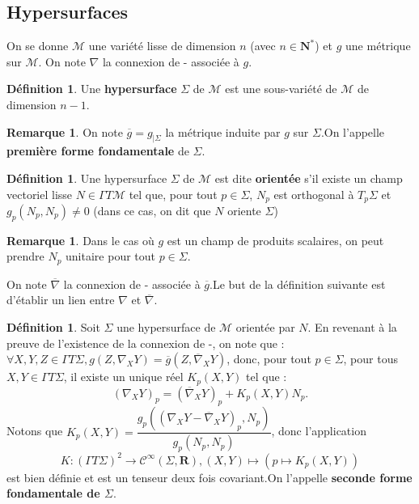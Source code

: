 \documentclass[12pt,a4paper]{article}
\theoremstyle{definition}
\newtheorem{defn}[thm]{Définition}
\newtheorem{rqe}[thm]{Remarque}
\begin{document}
\subsection{Hypersurfaces}
On se donne $\mathcal{M}$ une variété lisse de dimension $n$ (avec $n\in\mathbf{N}^*$) et $g$ une métrique sur $\mathcal{M}$. On note $\nabla$ la connexion de - associée à $g$.
\begin{defn}
Une \textbf{hypersurface} $\Sigma$ de $\mathcal{M}$ est une sous-variété de $\mathcal{M}$ de dimension $n-1$.
\end{defn}
\begin{rqe}
On note $\overline{g}=g_{|\Sigma}$ la métrique induite par $g$ sur $\Sigma$.\newline On l'appelle \textbf{première forme fondamentale} de $\Sigma$.
\end{rqe}
\begin{defn}
Une hypersurface $\Sigma$ de $\mathcal{M}$ est dite \textbf{orientée} s'il existe un champ vectoriel lisse $N\in\Gamma T\mathcal{M}$ tel que, pour tout $p\in\Sigma$, $N_p$ est orthogonal à $T_p\Sigma$ et $g_p(N_p,N_p)\neq 0$ (dans ce cas, on dit que $N$ oriente $\Sigma$)
\end{defn}
\begin{rqe}
Dans le cas où $g$ est un champ de produits scalaires, on peut prendre $N_p$ unitaire pour tout $p\in\Sigma$.
\end{rqe}
On note $\overline{\nabla}$ la connexion de - associée à $\overline{g}$.\newline Le but de la définition suivante est d'établir un lien entre $\nabla$ et $\overline{\nabla}$.
\begin{defn}
Soit $\Sigma$ une hypersurface de $\mathcal{M}$ orientée par $N$.\newline
En revenant à la preuve de l'existence de la connexion de -, on note que : $\forall X,Y,Z\in\Gamma T\Sigma, g(Z,\nabla_XY)=\overline{g}(Z,\overline{\nabla}_XY)$, donc, pour tout $p\in\Sigma$, pour tous $X,Y\in \Gamma T\Sigma$, il existe un unique réel $K_p(X,Y)$ tel que :
$$
\left(\nabla_XY\right)_p=\left(\overline{\nabla}_XY\right)_p+K_p(X,Y)N_p.
$$
Notons que $K_p(X,Y)=\dfrac{g_p\left(\left(\nabla_XY-\overline{\nabla}_XY\right)_p,N_p\right)}{g_p(N_p,N_p)}$, donc l'application $$K:\left(\Gamma T\Sigma\right)^2\to\mathcal{C}^\infty(\Sigma,\mathbf{R}),(X,Y)\mapsto \left(p\mapsto K_p(X,Y)\right)$$
est bien définie et est un tenseur deux fois covariant.\newline On l'appelle \textbf{seconde forme fondamentale de $\Sigma$}.
\end{defn}
\newpage
\end{document}
